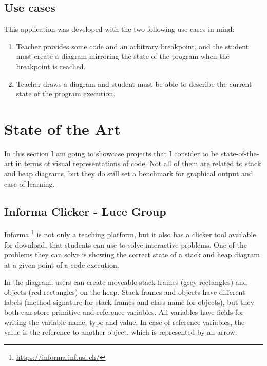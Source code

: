 \documentclass[]{usiinfbachelorproject}
\begin{document}
\subsection{Use cases}

This application was developed with the two following use cases in mind:

\begin{enumerate}
\item Teacher provides some code and an arbitrary breakpoint, and the student must create  a diagram mirroring the state of the program when the breakpoint is reached.
\item Teacher draws a diagram and student must be able to describe the current state of the program execution.
\end{enumerate}

\vspace{\fill}
\pagebreak

\section{State of the Art} \label{state}

In this section I am going to showcase projects that I consider to be state-of-the-art in terms of visual representations of code. Not all of them are related to stack and heap diagrams, but they do still set a benchmark for graphical output and ease of learning.

\subsection{Informa Clicker - Luce Group} \label{informa clicker}

\noindent Informa \footnote{\url{https://informa.inf.usi.ch/}} is not only a teaching platform, but it also has a clicker tool available for download, that students can use to solve interactive problems. One of the problems they can solve is showing the correct state of a stack and heap diagram at a given point of a code execution.

\noindent In the diagram, users can create moveable stack frames (grey rectangles) and objects (red rectangles) on the heap. Stack frames and objects have different labels (method signature for stack frames and class name for objects), but they both can store primitive and reference variables. All variables have fields for writing the variable name, type and value. In case of reference variables, the value is the reference to another object, which is represented by an arrow.\\
\end{document}
